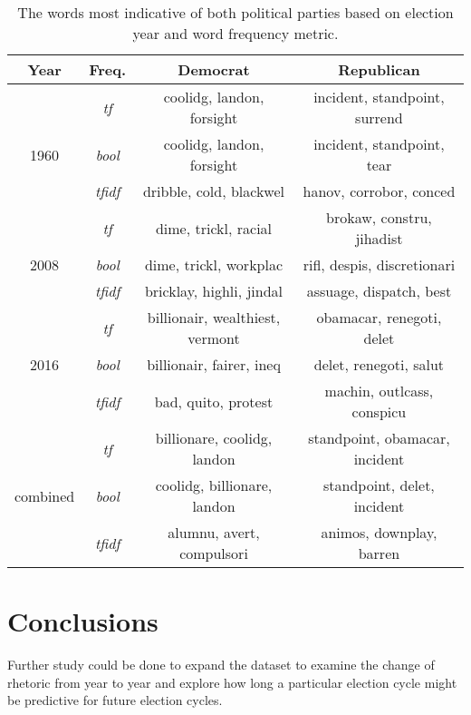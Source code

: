 \documentclass[aps, prl, reprint, showpacs]{revtex4-1}
\begin{document}
\begin{table*} %
  \begin{ruledtabular}
  \begin{tabular}{cccc}
  Year & Freq. & Democrat & Republican \\
    \hline
 & \textit{tf} & coolidg, landon, forsight  & incident, standpoint, surrend   \\
1960 & \textit{bool} & coolidg, landon, forsight   & incident, standpoint, tear  \\
 & \textit{tfidf} & dribble, cold, blackwel  & hanov, corrobor, conced  \\
 \hline
 & \textit{tf} & dime, trickl, racial  & brokaw, constru, jihadist  \\
2008 & \textit{bool} & dime, trickl, workplac  & rifl, despis, discretionari  \\
 & \textit{tfidf} & bricklay, highli, jindal  & assuage, dispatch, best  \\
 \hline
 & \textit{tf} & billionair, wealthiest, vermont  & obamacar, renegoti, delet   \\
2016 & \textit{bool} & billionair, fairer, ineq   & delet, renegoti, salut    \\
 & \textit{tfidf} & bad, quito, protest    & machin, outlcass, conspicu   \\
 \hline
  & \textit{tf} & billionare, coolidg, landon   & standpoint, obamacar, incident  \\
combined & \textit{bool} & coolidg, billionare, landon   & standpoint, delet, incident  \\
 & \textit{tfidf} & alumnu, avert, compulsori  & animos, downplay, barren  \\
 \hline
  \end{tabular}
  \end{ruledtabular}
    \caption{The words most indicative of both political parties based on election year and word frequency metric.}
    \label{tab:words}
\end{table*}


\section{Conclusions}

Further study could be done to expand the dataset to examine the change of rhetoric from year to year and explore how long a particular election cycle might be predictive for future election cycles.
\end{document}
